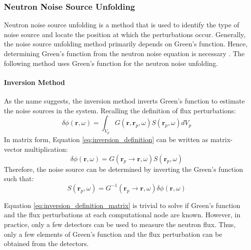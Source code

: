 \subsubsection{Neutron Noise Source Unfolding}

Neutron noise source unfolding is a method that is used to identify the type of noise source and locate the position at which the perturbations occur. Generally, the noise source unfolding method primarily depends on Green’s function. Hence, determining Green’s function from the neutron noise equation is necessary \cite{demaziereIdentificationLocalizationAbsorbers2005}. The following method uses Green’s function for the neutron noise unfolding.

\paragraph{Inversion Method}

As the name suggests, the inversion method inverts Green’s function to estimate the noise sources in the system. Recalling the definition of flux perturbations:
\begin{equation}
    \delta \phi (\textbf{r},\omega) = \int_{V_p} G(\textbf{r}, \textbf{r}_p, \omega) S(\textbf{r}_p, \omega) dV_p
    \label{eq:inversion_definition}
\end{equation}
In matrix form, Equation \ref{eq:inversion_definition} can be written as matrix-vector multiplication:
\begin{equation}
    \delta \phi (\textbf{r},\omega) = G(\textbf{r}_p \rightarrow \textbf{r}, \omega) S(\textbf{r}_p, \omega)
    \label{eq:inversion_definition_matrix}
\end{equation}
Therefore, the noise source can be determined by inverting the Green’s function such that:
\begin{equation}
    S(\textbf{r}_p, \omega) = G^{-1}(\textbf{r}_p \rightarrow \textbf{r}, \omega) \delta \phi (\textbf{r},\omega) 
    \label{eq:source_inversion_matrix}
\end{equation}

Equation \ref{eq:inversion_definition_matrix} is trivial to solve if Green’s function and the flux perturbations at each computational node are known. However, in practice, only a few detectors can be used to measure the neutron flux. Thus, only a few elements of Green’s function and the flux perturbation can be obtained from the detectors. 

